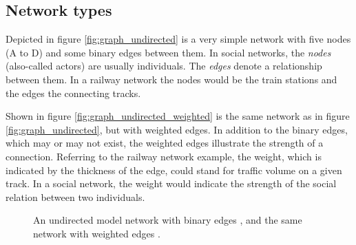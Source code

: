 \subsection{Network types}
\label{subsec:net_types}
Depicted in figure \ref{fig:graph_undirected} is a very simple network with five nodes (A to D) and some binary edges between them. In social networks, the \textit{nodes} (also-called actors) are usually individuals. The \textit{edges} denote a relationship between them. In a railway network the nodes would be the train stations and the edges the connecting tracks.

Shown in figure \ref{fig:graph_undirected_weighted} is the same network as in figure \ref{fig:graph_undirected}, but with weighted edges. In addition to the binary edges, which may or may not exist, the weighted edges illustrate the strength of a connection. Referring to the railway network example, the weight, which is indicated by the thickness of the edge, could stand for traffic volume on a given track. In a social network, the weight would indicate the strength of the social relation between two individuals.  


\begin{figure}[htpb]%
	\centering 
	\qquad 
	\caption[Undirected model network with binary and weighted edges]{An undirected model network with binary edges , and the same network with weighted edges .} 

\end{figure}	 

